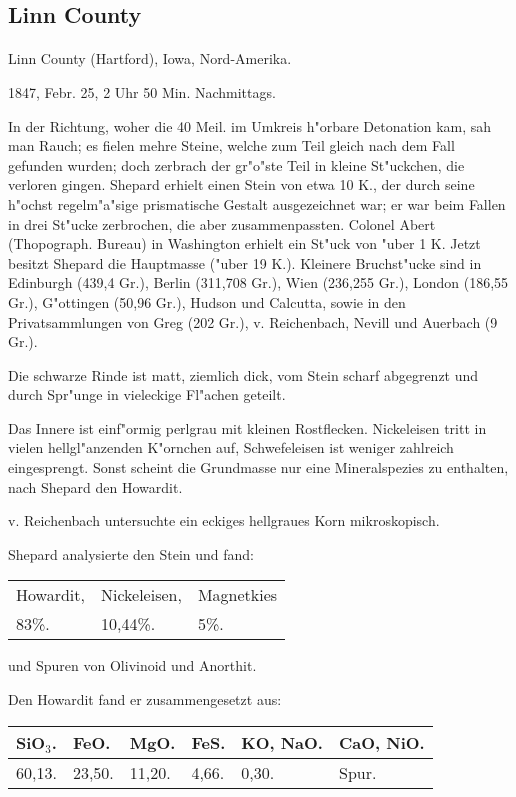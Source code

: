 \documentclass[a4paper, 11pt, oneside]{article}
\begin{document}
\subsection{Linn County}
\normalsize
\paragraph{}
Linn County (Hartford), Iowa, Nord-Amerika.

1847, Febr. 25, 2 Uhr 50 Min. Nachmittags.

In der Richtung, woher die 40 Meil. im Umkreis h"orbare Detonation kam, sah man Rauch; es fielen mehre Steine, welche zum Teil gleich nach dem Fall gefunden wurden; doch zerbrach der gr"o"ste Teil in kleine St"uckchen, die verloren gingen. Shepard erhielt einen Stein von etwa 10 K., der durch seine h"ochst regelm"a"sige prismatische Gestalt ausgezeichnet war; er war beim Fallen in drei St"ucke zerbrochen, die aber zusammenpassten. Colonel Abert (Thopograph. Bureau) in Washington erhielt ein St"uck von "uber 1 K. Jetzt besitzt Shepard die Hauptmasse ("uber 19 K.). Kleinere Bruchst"ucke sind in Edinburgh (439,4 Gr.), Berlin (311,708 Gr.), Wien (236,255 Gr.), London (186,55 Gr.), G"ottingen (50,96 Gr.), Hudson und Calcutta, sowie in den Privatsammlungen von Greg (202 Gr.), v. Reichenbach, Nevill und Auerbach (9 Gr.).

Die schwarze Rinde ist matt, ziemlich dick, vom Stein scharf abgegrenzt und durch Spr"unge in vieleckige Fl"achen geteilt.

Das Innere ist einf"ormig perlgrau mit kleinen Rostflecken. Nickeleisen tritt in vielen hellgl"anzenden K"ornchen auf, Schwefeleisen ist weniger zahlreich eingesprengt. Sonst scheint die Grundmasse nur eine Mineralspezies zu enthalten, nach Shepard den Howardit.

v. Reichenbach untersuchte ein eckiges hellgraues Korn mikroskopisch.

Shepard analysierte den Stein und fand:
\begin{table}[H]
    \centering
    \begin{tabular}{l l l}
        Howardit, & Nickeleisen, & Magnetkies \\
        83\%. & 10,44\%. & 5\%. \\
    \end{tabular}
\end{table}

und Spuren von Olivinoid und Anorthit.

Den Howardit fand er zusammengesetzt aus:
\begin{table}[H]
    \centering
    \begin{tabular}{l l l l l l}
        SiO$_{3}$. & FeO. & MgO. & FeS. & KO, NaO. & CaO, NiO.  \\ \hline
        60,13. & 23,50. & 11,20. & 4,66. & 0,30. & Spur. \\
    \end{tabular}
\end{table}
\end{document}
